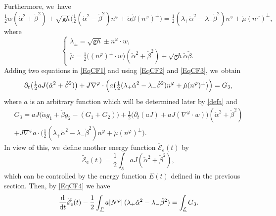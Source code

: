 \documentclass[10pt]{amsart}
\newcommand{\gr}{{\mathtt g}}
\newcommand{\dt}{\partial_t}
\newcommand{\cE}{{\mathcal E}}
\newcommand{\ul}[1]{\underline{#1}}
\newcommand{\itGamma}{\mathit{\Gamma}}
\theoremstyle{definition}
\begin{document}
Furthermore, we~have
\begin{equation}\label{EqCF3}
\tfrac12w(\check{\alpha}^2+\check{\beta}^2) + \sqrt{\gr h}\bigl(\tfrac12(\check{\alpha}^2-\check{\beta}^2)n^\varphi + \check{\alpha}\check{\beta}(n^\varphi)^\perp\bigr)
= \tfrac12(\lambda_+\check{\alpha}^2-\lambda_-\check{\beta}^2)n^\varphi + \check{\mu}(n^\varphi)^\perp,
\end{equation}
where
\[
\begin{cases}
\lambda_{\pm} = \sqrt{\gr h}\pm n^\varphi\cdot w, \\
\check{\mu} = \tfrac12\bigl((n^\varphi)^\perp\cdot w\bigr)(\check{\alpha}^2+\check{\beta}^2) + \sqrt{\gr h}\check{\alpha}\check{\beta}.
\end{cases}
\]
Adding two equations in \eqref{EqCF1} and using \eqref{EqCF2} and \eqref{EqCF3}, we~obtain
\begin{equation}\label{EqCF4}
\dt \bigl(\tfrac12aJ(\check{\alpha}^2+\check{\beta}^2) \bigr)
+ J\nabla^\varphi\cdot\Bigl(a \bigl(\tfrac12(\lambda_+\check{\alpha}^2-\lambda_-\check{\beta}^2)n^\varphi + \check{\mu}(n^\varphi)^\perp \bigr) \Bigr) = G_3,
\end{equation}
where $a$ is an arbitrary function which will be determined later by \eqref{defa} and
\begin{multline*}
G_3
= aJ \bigl(\check{\alpha}g_1+\check{\beta}g_2-(G_1+G_2) \bigl) + \tfrac12 \bigl(\dt(aJ)+aJ(\nabla^\varphi\cdot w) \bigr)(\check{\alpha}^2+\check{\beta}^2) \\
+ J\nabla^\varphi a \cdot \bigl(\tfrac12(\lambda_+\check{\alpha}^2-\lambda_-\check{\beta}^2)n^\varphi + \check{\mu}(n^\varphi)^\perp \bigr).
\end{multline*}
In view of this, we~define another energy function $\widetilde{\mathscr{E}}_\mathrm{e}(t)$ by
\begin{equation}\label{defEF2}
\widetilde{\mathscr{E}}_\mathrm{e}(t) = \frac12\int_{\ul{\cE}}aJ(\check{\alpha}^2+\check{\beta}^2),
\end{equation}
which can be controlled by the energy function $E(t)$ defined in the previous section.
Then, by \eqref{EqCF4} we have
\begin{equation}\label{EqCF5}
\frac{\rm d}{{\rm d}t}\widetilde{\mathscr{E}}_\mathrm{e}(t) - \frac12\int_{\ul{\itGamma}} a|N^\varphi|\,(\lambda_+\check{\alpha}^2-\lambda_-\check{\beta}^2)
= \int_{\ul{\cE}}G_3.
\end{equation}
\end{document}
